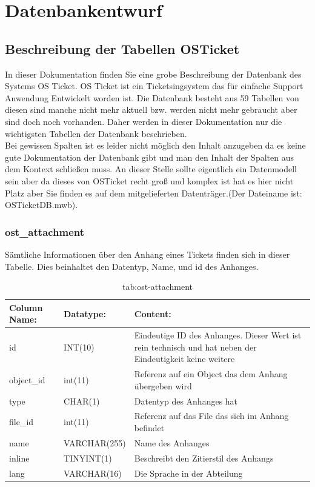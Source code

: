 \section{Datenbankentwurf}

\subsection{Beschreibung der Tabellen OSTicket}

In dieser Dokumentation finden Sie eine grobe Beschreibung der Datenbank des Systems OS Ticket. OS Ticket ist ein Ticketsingsystem das für einfache Support Anwendung Entwickelt worden ist. Die Datenbank besteht aus 59 Tabellen von diesen sind manche nicht mehr aktuell bzw. werden nicht mehr gebraucht aber sind doch noch vorhanden. Daher werden in dieser Dokumentation nur die wichtigsten Tabellen der Datenbank beschrieben.\\
Bei gewissen Spalten ist es leider nicht möglich den Inhalt anzugeben da es keine gute Dokumentation der Datenbank gibt und man den Inhalt der Spalten aus dem Kontext schließen muss.
\newline
\newline
An dieser Stelle sollte eigentlich ein Datenmodell sein aber da dieses von OSTicket recht groß und komplex ist hat es hier nicht Platz aber Sie finden es auf dem mitgelieferten Datenträger.(Der Dateiname ist: OSTicketDB.mwb).

\subsubsection{ost\_attachment}

Sämtliche Informationen über den Anhang eines Tickets finden sich in dieser Tabelle. Dies beinhaltet den Datentyp, Name, und id des Anhanges. 

\begin{table}[h]
	\begin{tabular}{|p{3cm}|p{4cm}|p{7.7cm}|}
		\hline
		\textbf{Column Name:} & \textbf{Datatype:} & \textbf{Content:} \\
		\hline
		id & INT(10) & Eindeutige ID des Anhanges. Dieser Wert ist rein technisch und hat  neben der Eindeutigkeit keine weitere  \\
		\hline
		object\_id & int(11) & Referenz auf ein Object das dem Anhang übergeben wird \\
		\hline
		type & CHAR(1) & Datentyp des Anhanges hat \\
		\hline
		file\_id & int(11) & Referenz auf das File das sich im Anhang befindet\\
		\hline
		name & VARCHAR(255) & Name des Anhanges \\
		\hline
		inline & TINYINT(1) & Beschreibt den Zitierstil des Anhangs \\
		\hline
		lang & VARCHAR(16) & Die Sprache in der Abteilung \\
		\hline
	\end{tabular}
	\caption{tab:ost-attachment}
\end{table}
\label{tab:ost_attachment}

